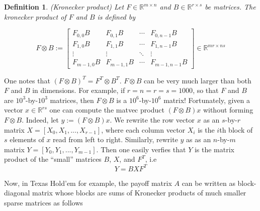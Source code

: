 \documentclass{article} %
\newtheorem{definition}[theorem]{Definition}
\begin{document}
\begin{definition}(Kronecker product)
Let $F \in \mathbb{R}^{m \times n}$ and $B \in \mathbb{R}^{r \times
  s}$ be matrices. The kronecker product of $F$ and $B$ is defined by

\begin{equation}
F \otimes B:=\left[
\begin{array}{cccc}
F_{0,0}B & F_{0,1}B & \cdots & F_{0,n-1}B \\
F_{1,0}B & F_{1,1}B & \cdots & F_{1,n-1}B \\
\vdots & \vdots & \ddots & \vdots\\
F_{m-1,0}B & F_{m-1,1}B & \cdots & F_{m-1,n-1}B 
\end{array}\right] \in \mathbb{R}^{mr \times ns}
\end{equation}
\end{definition}

One notes that $(F \otimes B)^T = F^T \otimes B^T$.
$F \otimes B$ can be very much larger than both $F$ and $B$ in dimensions. For example, if $r = n = r = s = 1000$, so that $F$ and $B$ are $10^3$-by-$10^3$ matrices, then $F \otimes B$ is a $10^6$-by-$10^6$ matrix! Fortunately, given a vector $x \in \mathbb{R}^{rs}$ one can compute the matvec product $(F \otimes B)x$ without forming $F \otimes B$. Indeed, let $y := (F \otimes B)x$. We rewrite the row vector $x$ as an $s$-by-$r$ matrix $X = [X_0, X_1, ..., X_{r-1}]$, where each column vector $X_i$ is the $i$th block of $s$ elements of $x$ read from left to right. Similarly, rewrite $y$ as as an $n$-by-$m$ matrix $Y = [Y_0, Y_1, ..., Y_{m-1}]$. Then one easily verfies that $Y$ is the matrix product of the ``small'' matrices $B$, $X$, and $F^T$, i.e
\begin{equation}
  \label{eq:kron_matvec}
  Y = BXF^T
\end{equation}

Now, in Texas Hold'em for example, the payoff matrix $A$ can be written as block-diagonal matrix whose blocks are sums of Kronecker products of much smaller sparse matrices as follows
\end{document}
